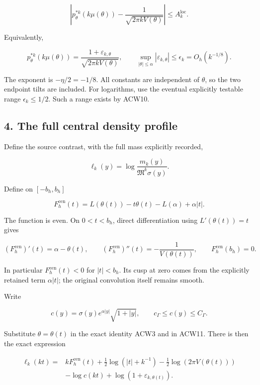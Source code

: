 \[
\left|
p_\theta^{*k}(k\mu(\theta))
-\frac1{\sqrt{2\pi kV(\theta)}}
\right|\le A_k^{\mathrm{loc}}.
\]

Equivalently,

\[
\boxed{
p_\theta^{*k}(k\mu(\theta))
=\frac{1+\varepsilon_{k,\theta}}
{\sqrt{2\pi kV(\theta)}},
\qquad
\sup_{|\theta|\le\alpha}|\varepsilon_{k,\theta}|\le\epsilon_k
=O_h(k^{-1/8}).}
\tag{ACW11}
\]

The exponent is \(-\eta/2=-1/8\). All constants are independent of \(\theta\), so the two endpoint tilts are included. For logarithms, use the eventual explicitly testable range \(\epsilon_k\le1/2\). Such a range exists by ACW10.

\subsection{4. The full central density profile}\label{acw:the-full-central-density-profile}

Define the source contrast, with the full mass explicitly recorded,

\[
\ell_k(y)=\log\frac{m_k(y)}{\mathfrak M^k\sigma(y)}.
\]

Define on \([-b_h,b_h]\)

\[
F_h^{\mathrm{cen}}(t)=
L(\theta(t))-t\theta(t)-L(\alpha)+\alpha|t|.
\tag{ACW12}
\]

The function is even. On \(0<t<b_h\), direct differentiation using \(L'(\theta(t))=t\) gives

\[
(F_h^{\mathrm{cen}})'(t)=\alpha-\theta(t),
\qquad
(F_h^{\mathrm{cen}})''(t)=-\frac1{V(\theta(t))},
\qquad F_h^{\mathrm{cen}}(b_h)=0.
\]

In particular \(F_h^{\mathrm{cen}}(t)<0\) for \(|t|<b_h\). Its cusp at zero comes from the explicitly retained term \(\alpha|t|\); the original convolution itself remains smooth.

Write

\[
c(y)=\sigma(y)e^{\alpha|y|}\sqrt{1+|y|},
\qquad c_\Gamma\le c(y)\le C_\Gamma.
\]

Substitute \(\theta=\theta(t)\) in the exact identity ACW3 and in ACW11. There is then the exact expression

\[
\boxed{
\begin{aligned}
\ell_k(kt)={}&kF_h^{\mathrm{cen}}(t)
+\tfrac12\log(|t|+k^{-1})
-\tfrac12\log(2\pi V(\theta(t)))\\
&-\log c(kt)+\log(1+\varepsilon_{k,\theta(t)}).
\end{aligned}}
\tag{ACW13}
\]

